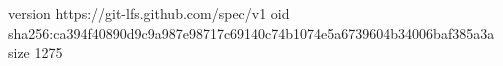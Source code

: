 version https://git-lfs.github.com/spec/v1
oid sha256:ca394f40890d9c9a987e98717c69140c74b1074e5a6739604b34006baf385a3a
size 1275
